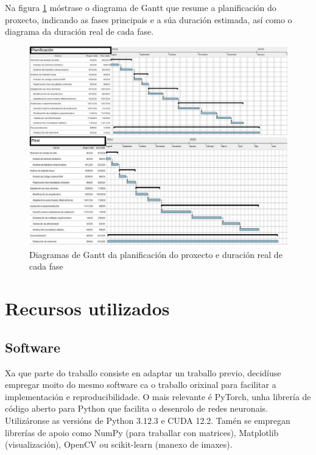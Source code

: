 Na figura \ref{fig:planificacion_proxecto} móstrase o diagrama de Gantt que resume a planificación do proxecto, indicando as fases principais e a súa duración estimada, así como o diagrama da duración real de cada fase.

\begin{figure}[h]
    \centering
    \includegraphics[height=1\textwidth, angle=90]{imaxes/gants-1.png}
    \caption{Diagramas de Gantt da planificación do proxecto e duración real de cada fase}
    \label{fig:planificacion_proxecto}
\end{figure}

\section{Recursos utilizados}
\label{sec:Recursos utilizados}

\subsection{Software}
\label{subsec:Software}

Xa que parte do traballo consiste en adaptar un traballo previo, 
decidíuse empregar moito do mesmo software ca o traballo orixinal para facilitar a implementación e reproducibilidade.
O mais relevante é PyTorch, unha librería de código aberto para Python que facilita o desenrolo de redes neuronais. Utilizáronse as versións de Python 3.12.3 e CUDA 12.2. Tamén se empregan librerías de apoio como NumPy (para traballar con matrices), Matplotlib (visualización), OpenCV ou scikit-learn (manexo de imaxes).

